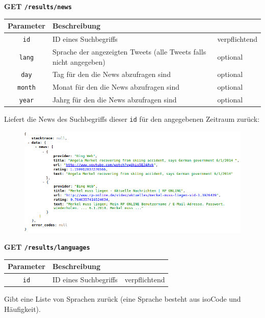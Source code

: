\noindent
\textbf{GET \texttt{/results/news}}
\begin{table}[h!]
\begin{tabular}{| c | p{\tweite} | l |}
\hline
	\textbf{Parameter} & \textbf{Beschreibung} &  \\
\hline \hline
 	\texttt{id} & ID eines Suchbegriffs & verpflichtend \\
\hline
 	\texttt{lang} & Sprache der angezeigten Tweets (alle Tweets falls nicht angegeben) & optional \\
\hline
 	 \texttt{day} &  Tag für den die News abzufragen sind & optional \\
\hline
 	 \texttt{month} & Monat für den die News abzufragen sind & optional \\
\hline
 	 \texttt{year} & Jahrg für den die News abzufragen sind & optional \\
\hline
\end{tabular}
\end{table}
\newline
Liefert die News des Suchbegriffs dieser \texttt{id} für den angegebenen Zeitraum zurück:
\begin{figure}[h!]
\includegraphics[scale=0.6]{Bilder/RestApi/resultNews.png}
\end{figure}

\newpage
\noindent
\textbf{GET \texttt{/results/languages}}
\begin{table}[h!]
\begin{tabular}{| c | p{\tweite} | l |}
\hline
	\textbf{Parameter} & \textbf{Beschreibung} &  \\
\hline \hline
 	\texttt{id} & ID eines Suchbegriffs & verpflichtend \\
\hline
\end{tabular}
\end{table}
\newline
Gibt eine Liste von Sprachen zurück (eine Sprache besteht aus isoCode und Häufigkeit).

